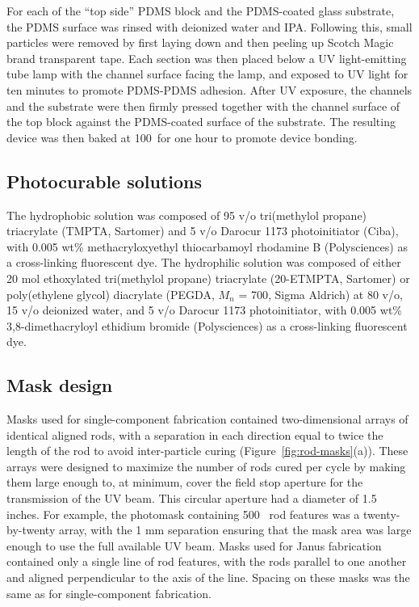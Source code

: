 For each of the ``top side'' PDMS block and the PDMS-coated glass substrate, the PDMS surface was rinsed with 
deionized water and IPA.  Following this, small particles were removed by first laying down and then peeling up
Scotch Magic brand transparent tape.  Each section was then placed below a UV light-emitting
tube lamp with the channel surface facing the lamp, and exposed to UV light for ten minutes to promote PDMS-PDMS
adhesion.  After UV exposure, the channels and the 
substrate were then firmly pressed together with the channel surface of the top
block against the PDMS-coated surface of the substrate.  The resulting device was then baked at 100\degC~for one hour
to promote device bonding.

\subsection{Photocurable solutions}
\label{sec:janus-materials}
The hydrophobic solution was composed of 95 v/o 
tri(methylol propane) triacrylate (TMPTA, Sartomer) and 5 v/o Darocur 1173 photoinitiator (Ciba), 
with 0.005 wt\% methacryloxyethyl thiocarbamoyl rhodamine B (Polysciences) as a cross-linking 
fluorescent dye.
The hydrophilic solution was composed of either 20 mol ethoxylated tri(methylol propane) triacrylate (20-ETMPTA,
Sartomer) or poly(ethylene glycol) diacrylate (PEGDA, $M_n$ = 700, Sigma Aldrich) at 80 v/o, 
15 v/o deionized water, and 5 v/o Darocur 1173 photoinitiator, with 0.005 wt\% 
3,8-dimethacryloyl ethidium bromide (Polysciences) as a cross-linking fluorescent dye.


\subsection{Mask design}

Masks used for single-component fabrication contained two-dimensional arrays of identical aligned 
rods, with a separation in each direction equal to twice the length of the rod to avoid inter-particle
curing (Figure~\ref{fig:rod-masks}(a)). These arrays were designed to maximize the number of 
rods cured per cycle by making them large enough to, at minimum,
cover the field stop aperture for the transmission of the UV beam. This circular aperture 
had a diameter of 1.5 inches.  For example, the photomask containing 500 \microns~rod features
was a twenty-by-twenty array, with the 1 mm separation ensuring that the mask area was large enough to
use the full available UV beam.  
Masks used for Janus fabrication contained only a single line of rod features, with the rods parallel to one 
another and aligned perpendicular to the axis of the line.  Spacing on these 
masks was the same as for single-component fabrication.


